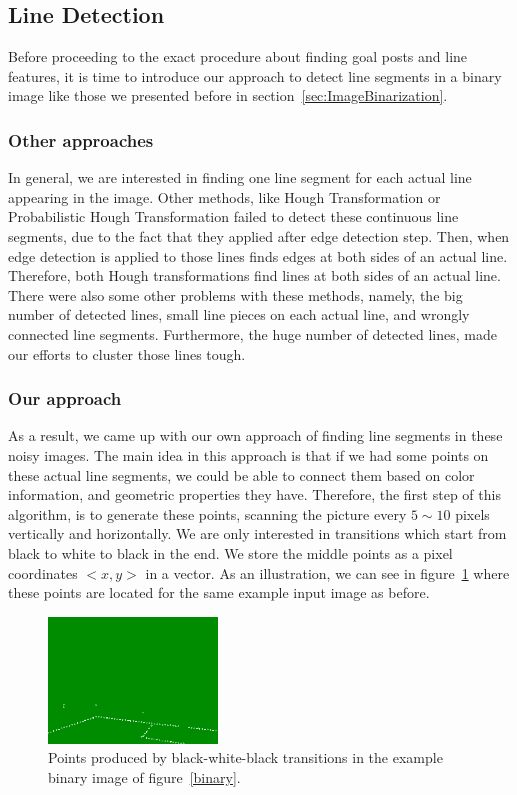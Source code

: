 \documentclass[	DIV=calc,%
							paper=a4,%
							fontsize=9pt,%
							twocolumn]{scrartcl}	 					%
\begin{document}
\subsection{Line Detection}
Before proceeding to the exact procedure about finding goal posts and line features, it is time to introduce our approach to detect line segments in a binary image like those we presented before in section~\ref{sec:ImageBinarization}.

\subsubsection{Other approaches}
In general, we are interested in finding one line segment for each actual line appearing in the image. Other methods, like Hough Transformation or Probabilistic Hough Transformation failed to detect these continuous line segments, due to the fact that they applied after edge detection step. Then, when edge detection is applied to those lines finds edges at both sides of an actual line. Therefore, both Hough transformations find lines at both sides of an actual line. There were also some other problems with these methods, namely, the big number of detected lines, small line pieces on each actual line, and wrongly connected line segments. Furthermore, the huge number of detected lines, made our efforts to cluster those lines tough.

\subsubsection{Our approach}
As a result, we came up with our own approach of finding line segments in these noisy images. The main idea in this approach is that if we had some points on these actual line segments, we could be able to connect them based on color information, and geometric properties they have. Therefore, the first step of this algorithm, is to generate these points, scanning the picture every $5 \sim 10$ pixels vertically and horizontally. We are only interested in transitions which start from black to white to black in the end. We store the middle points as a pixel coordinates $<x,y>$ in a vector. As an illustration, we can see in figure~\ref{points} where these points are located for the same example input image as before.
\begin{figure}[t!]
\caption{Points produced by black-white-black transitions in the example binary image of figure~\ref{binary}.}
\label{points}
\centering    
\includegraphics[width=0.4\textwidth]{figures/points.png}
\end{figure}
\end{document}
